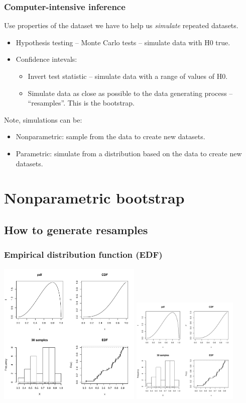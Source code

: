 \documentclass[a4paper,12pt]{article}
\newcommand{\bc}{\begin{center}}
\newcommand{\ec}{\end{center}}
\newcommand{\bi}{\begin{itemize}}
\newcommand{\ei}{\end{itemize}}
\begin{document}
\begin{frame}[fragile]
\frametitle{Computer-intensive inference}
Use properties of the dataset we have to help us \emph{simulate} repeated datasets.
\bi
\item <2->Hypothesis testing -- Monte Carlo tests -- simulate data with H0 true.
\item <3->Confidence intevals:
\bi
\item <4->Invert test statistic -- simulate data with a range of values of H0.
\item <5->Simulate data as close as possible to the data generating process -- ``resamples''.  This is the bootstrap.
\ei
\ei

Note, simulations can be:
\bi
\item <6->Nonparametric: sample from the data to create new datasets.
\item <7->Parametric: simulate from a distribution based on the data to create new datasets.
\ei
\end{frame}


\section{Nonparametric bootstrap}

\subsection{How to generate resamples}

\begin{frame}
    \frametitle{Empirical distribution function (EDF)}
    \bc
        	  {\includegraphics[height=2.7in]{edf}}
        	 \mode<article> {\includegraphics[height=2.0in]{edf}}
    \ec
\end{frame}
\end{document}
